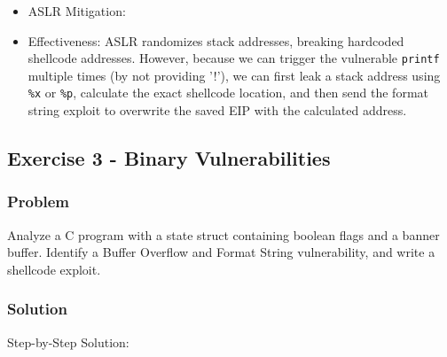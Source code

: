 \documentclass{article}
\begin{document}
\begin{itemize}
    \item[\textbf{4.}] ASLR Mitigation:
    \item Effectiveness: ASLR randomizes stack addresses, breaking hardcoded shellcode addresses. However, because we can trigger the vulnerable \texttt{printf} multiple times (by not providing '!'), we can first leak a stack address using \texttt{\%x} or \texttt{\%p}, calculate the exact shellcode location, and then send the format string exploit to overwrite the saved EIP with the calculated address.
\end{itemize}

\subsection{Exercise 3 - Binary Vulnerabilities}
\subsubsection*{Problem}
Analyze a C program with a state struct containing boolean flags and a banner buffer. Identify a Buffer Overflow and Format String vulnerability, and write a shellcode exploit.

\subsubsection*{Solution}
Step-by-Step Solution:
\end{document}
